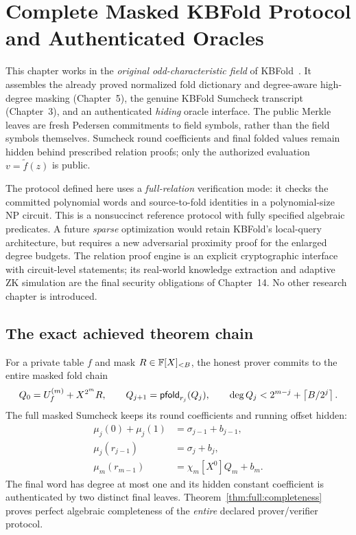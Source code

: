 \section{Complete Masked KBFold Protocol and Authenticated Oracles}\label{sec:full}
This chapter works in the \emph{original odd-characteristic
field} of KBFold~\cite{MkhidaKBFold2026}.
It assembles the already proved normalized fold
dictionary and degree-aware high-degree masking
(Chapter~5), the genuine KBFold Sumcheck
transcript (Chapter~3), and an authenticated
\emph{hiding} oracle interface.
The public Merkle leaves are fresh Pedersen
commitments to field symbols, rather than
the field symbols themselves. Sumcheck
round coefficients and final folded
values remain hidden behind prescribed
relation proofs; only the authorized
evaluation $v=\widetilde f(z)$ is public.

The protocol defined here uses a
\emph{full-relation} verification mode:
it checks the committed polynomial
words and source-to-fold identities
in a polynomial-size NP circuit.
This is a nonsuccinct reference
protocol with fully specified
algebraic predicates.
A future \emph{sparse} optimization
would retain KBFold's local-query
architecture, but requires a new
adversarial proximity proof for
the enlarged degree budgets.
The relation proof engine is
an explicit cryptographic interface
with circuit-level statements;
its real-world knowledge extraction
and adaptive ZK simulation are the
final security obligations of
Chapter~14. No other research
chapter is introduced.








\subsection{The exact achieved theorem chain}\label{sec:full:conclusion}
For a private table $f$ and mask
$R\in\mathbb{F}[X]_{<B}$, the honest
prover commits to the entire
masked fold chain
\[
 Q_0=U_f^{(m)}+X^{2^m}R,\qquad
 Q_{j+1}=\mathsf{pfold}_{r_j}(Q_j),\qquad
 \deg Q_j<2^{m-j}+\left\lceil B/2^j\right\rceil.
\]
The full masked Sumcheck keeps
its round coefficients and
running offset hidden:
\[
 \boxed{
 \begin{aligned}
 \mu_j(0)+\mu_j(1)&=\sigma_{j-1}+b_{j-1},\\
 \mu_j(r_{j-1})&=\sigma_j+b_j,\\
 \mu_m(r_{m-1})&=\chi_m[X^0]Q_m+b_m.
 \end{aligned}}
\]
The final word has degree at most
one and its hidden constant
coefficient is authenticated
by two distinct final leaves.
Theorem~\ref{thm:full:completeness}
proves perfect algebraic
completeness of the \emph{entire}
declared prover/verifier protocol.

